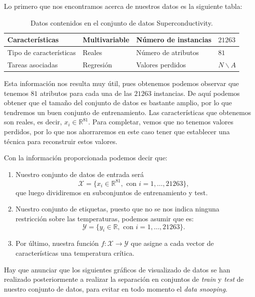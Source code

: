\documentclass[a4paper, 20pt]{article}
\newcommand{\R}{\mathbb R}
\begin{document}
Lo primero que nos encontramos acerca de nuestros datos es la siguiente tabla:
\begin{table}[h]
  \centering
  \begin{tabular}{|l|l|l|l|}
    \hline
    Características         & Multivariable & Número de instancias & $21263$ \\ \hline
    Tipo de características & Reales        & Número de atributos  & $81$    \\ \hline
    Tareas asociadas        & Regresión     & Valores perdidos     & $N\backslash A$   \\ \hline
  \end{tabular}
  \caption{Datos contenidos en el conjunto de datos Superconductivity.}
\end{table}


Esta información nos resulta muy útil, pues obtenemos podemos observar que tenemos $81$ atributos para cada una de las $21263$ instancias. De aquí podemos obtener que el tamaño del conjunto de datos es bastante amplio, por lo que tendremos un buen conjunto de entrenamiento. Las características que obtenemos son reales, es decir, $x_i \in \mathbb R^{81}$. Para completar, vemos que no tenemos valores perdidos, por lo que nos ahorraremos en este caso tener que establecer una técnica para reconstruir estos valores.

Con la información proporcionada podemos decir que:

\begin{enumerate}
\item Nuestro conjunto de datos de entrada será
  $$\mathcal X = \{ x_i \in \R^{81}, \text{ con } i = 1, \dots , 21263 \},$$
  que luego dividiremos en subconjuntos de entrenamiento y test.

\item Nuestro conjunto de etiquetas, puesto que no se nos indica ninguna restricción sobre las temperaturas, podemos asumir que es:
  $$
  \mathcal Y = \{ y_i \in \R, \text { con } i = 1,\dots,21263\}.
  $$

\item Por último, nuestra función $f : \mathcal X \to \mathcal Y$ que asigne a cada vector de características una temperatura crítica.
  
\end{enumerate}

Hay que anunciar que los siguientes gráficos de visualizado de datos se han realizado posteriormente a realizar la separación en conjuntos de \emph{train} y \emph{test} de nuestro conjunto de datos, para evitar en todo momento el \emph{data snooping}.\\
\end{document}
